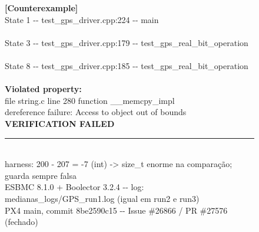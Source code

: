 \begin{figure}[H]
    \centering
    \begin{tcolorbox}[colback=ceFundo, colframe=black!45, boxrule=0.6pt, arc=2pt,
      left=8pt, right=8pt, top=6pt, bottom=6pt, width=0.95\linewidth,
      fontupper=\ttfamily\scriptsize\linespread{1.45}\selectfont]
    \textcolor{ceVermelho}{\textbf{[Counterexample]}}\\
    \textcolor{ceCinza}{State 1 -{}- test\_gps\_driver.cpp:224 -{}- main}\\
    \hspace*{1em}\\
    \textcolor{ceCinza}{State 3 -{}- test\_gps\_driver.cpp:179 -{}- test\_gps\_real\_bit\_operation}\\
    \hspace*{1em}\\
    \textcolor{ceCinza}{State 8 -{}- test\_gps\_driver.cpp:185 -{}- test\_gps\_real\_bit\_operation}\\
    \hspace*{1em}\\
    \textcolor{ceVermelho}{\textbf{Violated property:}}\\
    \textcolor{ceVermelho}{\hspace*{1em}file string.c line 280 function \_\_memcpy\_impl}\\
    \textcolor{ceVermelho}{\hspace*{1em}dereference failure: Access to object out of bounds}\\
    \textcolor{ceVermelho}{\textbf{VERIFICATION FAILED}}\\[-2pt]
    \textcolor{ceCinza}{\rule{\linewidth}{0.3pt}}\\
    \textcolor{ceAmarelo}{harness: 200 - 207 = -7 (int) -> size\_t enorme na compara\c{c}\~ao; guarda sempre falsa}\\
    \textcolor{ceCinza}{ESBMC 8.1.0 + Boolector 3.2.4 -{}- log: medianas\_logs/GPS\_run1.log (igual em run2 e run3)}\\
    \textcolor{ceCinza}{PX4 main, commit 8be2590c15 -{}- Issue \#26866 / PR \#27576 (fechado)}
    \end{tcolorbox}
    \caption[Contraexemplo do GPS uBlox (saída do ESBMC)]{}
    \label{fig:ce-gps}
\end{figure}

